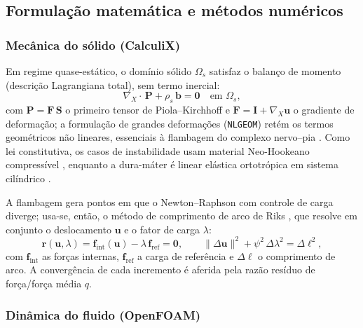 \documentclass[article, hidelinks,oneside,12pt]{abntex2}
\begin{document}
\subsection*{Formulação matemática e métodos numéricos}
\label{sec:teoria}

\subsubsection*{Mecânica do sólido (CalculiX)}
\label{sec:teoria-solido}

Em regime quase-estático, o domínio sólido $\Omega_s$ satisfaz o balanço de momento (descrição Lagrangiana total), sem termo inercial:
\begin{equation}
  \nabla_{\!X}\!\cdot\,\mathbf{P} + \rho_s\,\mathbf{b} = \mathbf{0}
  \quad\text{em } \Omega_s,
  \label{eq:equilibrio-solido}
\end{equation}
com $\mathbf{P} = \mathbf{F}\,\mathbf{S}$ o primeiro tensor de Piola--Kirchhoff e $\mathbf{F} = \mathbf{I} + \nabla_{\!X}\mathbf{u}$ o gradiente de deformação; a formulação de grandes deformações (\texttt{NLGEOM}) retém os termos geométricos não lineares, essenciais à flambagem do complexo nervo--pia \cite{bonet2008, belytschko2014}. Como lei constitutiva, os casos de instabilidade usam material Neo-Hookeano compressível \cite{bonet2008}, enquanto a dura-máter é linear elástica ortotrópica em sistema cilíndrico \cite{holzapfel2000}.

A flambagem gera pontos em que o Newton--Raphson com controle de carga diverge; usa-se, então, o método de comprimento de arco de Riks \cite{crisfield1991}, que resolve em conjunto o deslocamento $\mathbf{u}$ e o fator de carga $\lambda$:
\begin{equation}
  \mathbf{r}(\mathbf{u},\lambda)
  = \mathbf{f}_{\mathrm{int}}(\mathbf{u}) - \lambda\,\mathbf{f}_{\mathrm{ref}}
  = \mathbf{0},
  \qquad
  \lVert \Delta\mathbf{u}\rVert^2 + \psi^2\,\Delta\lambda^2 = \Delta\ell^2,
  \label{eq:riks}
\end{equation}
com $\mathbf{f}_{\mathrm{int}}$ as forças internas, $\mathbf{f}_{\mathrm{ref}}$ a carga de referência e $\Delta\ell$ o comprimento de arco. A convergência de cada incremento é aferida pela razão resíduo de força/força média $q$.

\subsubsection*{Dinâmica do fluido (OpenFOAM)}
\label{sec:teoria-fluido}
\end{document}
